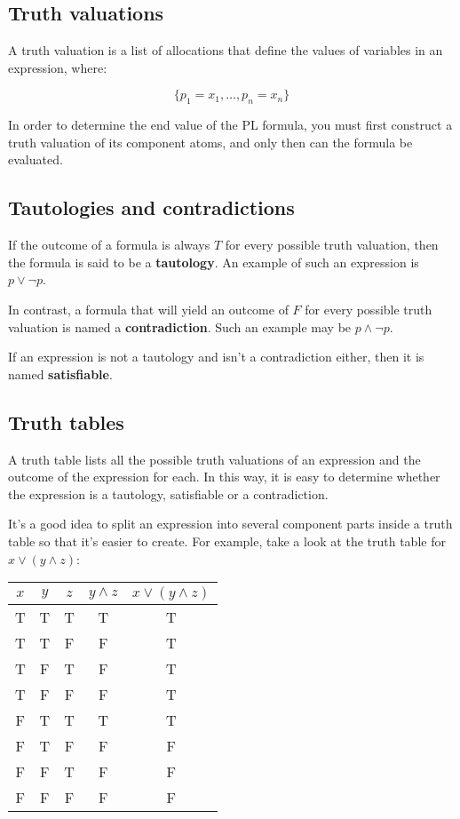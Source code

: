 \subsection{Truth valuations}

A truth valuation is a list of allocations that define the values of variables
in an expression, where:

\begin{dmath*}
	\{p_1=x_1,\dots, p_n=x_n\}
\end{dmath*}


In order to determine the end value of the PL formula, you must first construct
a truth valuation of its component atoms, and only then can the formula be
evaluated.

\subsection{Tautologies and contradictions}

If the outcome of a formula is always $T$ for every possible truth valuation,
then the formula is said to be a {\bf tautology}. An example of such an
expression is $p \vee \neg p$.

In contrast, a formula that will yield an outcome of $F$ for every possible
truth valuation is named a {\bf contradiction}. Such an example may be $p \wedge
\neg p$.

If an expression is not a tautology and isn't a contradiction either, then it is
named {\bf satisfiable}.

\subsection{Truth tables}

A truth table lists all the possible truth valuations of an expression and the
outcome of the expression for each. In this way, it is easy to determine whether
the expression is a tautology, satisfiable or a contradiction.

It's a good idea to split an expression into several component parts inside a
truth table so that it's easier to create. For example, take a look at the truth
table for $x \vee (y \wedge z)$:

\begin{center}
	\begin{tabular}{|c c c|c|c|}
		\hline
		$x$ & $y$ & $z$ & $y \wedge z$ & $x \vee (y \wedge z)$\\ \hline
		T & T & T & T & T\\
		T & T & F & F & T\\
		T & F & T & F & T\\
		T & F & F & F & T\\
		F & T & T & T & T\\
		F & T & F & F & F\\
		F & F & T & F & F\\
		F & F & F & F & F\\ \hline
	\end{tabular}
\end{center}

